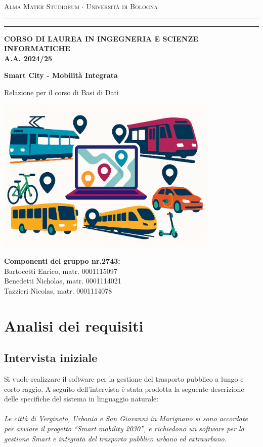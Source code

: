 \documentclass[12pt,a4paper]{report}
\begin{document}
\begin{titlepage}
\begin{center}
{{\Large{\textsc{Alma Mater Studiorum $\cdot$ Università di Bologna}}}} \rule[0.1cm]{15.8cm}{0.1mm}
\rule[0.5cm]{15.8cm}{0.6mm}
{\small{\bf CORSO DI LAUREA IN INGEGNERIA E SCIENZE INFORMATICHE \\ A.A. 2024/25 }}
\end{center}
\vspace{15mm}
\begin{center}
{\LARGE{\bf Smart City - Mobilità Integrata}}
\end{center}
\begin{center}
{\LARGE Relazione per il corso di Basi di Dati }
\end{center}

\vspace{8mm}
\begin{center}
\includegraphics[width=0.8\textwidth]{Copertina}
\end{center}
\vspace{10mm}

{\large{\bf \noindent
Componenti del gruppo nr.2743:\\}
Bartocetti Enrico, matr. 0001115097\\
Benedetti Nicholas, matr. 0001114021\\
Tazzieri Nicolas, matr. 0001114078}

\end{titlepage}

\tableofcontents


\chapter{Analisi dei requisiti}

\section{Intervista iniziale}
Si vuole realizzare il software per la gestione del trasporto pubblico a lungo e corto raggio.
A seguito dell’intervista è stata prodotta la seguente descrizione delle specifiche del sistema in linguaggio naturale:
\\ \\
\textit{Le città di Vergineto, Urbania e San Giovanni in Marignano si sono accordate per avviare il progetto “Smart mobility 2030”, e richiedono un software per la gestione Smart e integrata del trasporto pubblico urbano ed extraurbano.}
\end{document}
